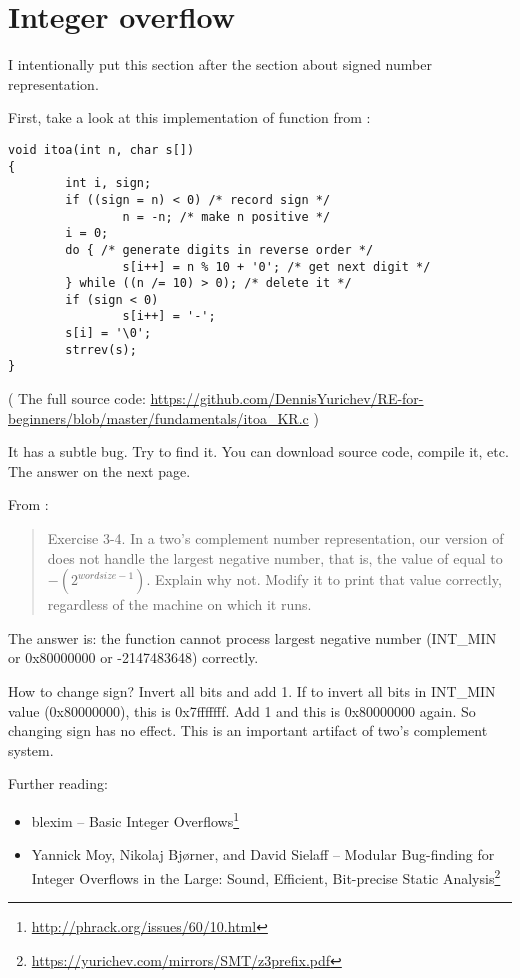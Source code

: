 \section{Integer overflow}

I intentionally put this section after the section about signed number representation.

First, take a look at this implementation of  function from \InSqBrackets{\KRBook}:

\begin{lstlisting}[style=customc]
void itoa(int n, char s[])
{
        int i, sign;
        if ((sign = n) < 0) /* record sign */
                n = -n; /* make n positive */
        i = 0;
        do { /* generate digits in reverse order */
                s[i++] = n % 10 + '0'; /* get next digit */
        } while ((n /= 10) > 0); /* delete it */
        if (sign < 0)
                s[i++] = '-';
        s[i] = '\0';
        strrev(s);
}
\end{lstlisting}

( The full source code: \url{https://github.com/DennisYurichev/RE-for-beginners/blob/master/fundamentals/itoa_KR.c} )

It has a subtle bug. Try to find it. You can download source code, compile it, etc.
The answer on the next page.

\clearpage

From \InSqBrackets{\KRBook}:

\begin{framed}
\begin{quotation}
Exercise 3-4. In a two's complement number representation, our version of 
does not handle the largest negative number, that is, the value
of  equal to $-(2^{wordsize-1})$. Explain why not. Modify it to
print that value correctly, regardless of the machine on which
it runs.
\end{quotation}
\end{framed}

The answer is: the function cannot process largest negative number (INT\_MIN or 0x80000000 or -2147483648) correctly.

How to change sign? Invert all bits and add 1.
If to invert all bits in INT\_MIN value (0x80000000), this is 0x7fffffff. Add 1 and this is 0x80000000 again.
So changing sign has no effect.
This is an important artifact of two's complement system.

Further reading:

\begin{itemize}
\item blexim -- Basic Integer Overflows\footnote{\url{http://phrack.org/issues/60/10.html}}

\item Yannick Moy, Nikolaj Bjørner, and David Sielaff -- Modular Bug-finding for Integer Overflows in the Large: Sound, Efficient, Bit-precise Static Analysis\footnote{\url{https://yurichev.com/mirrors/SMT/z3prefix.pdf}}
\end{itemize}

